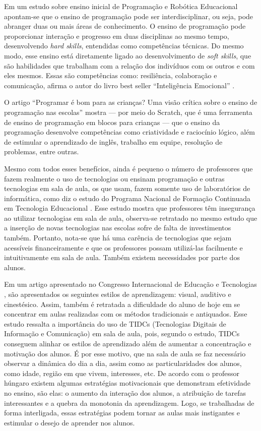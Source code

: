 Em um estudo sobre ensino inicial de Programação e Robótica Educacional \cite{antonello_cardoso_2015} apontam-se que o ensino de programação pode ser interdisciplinar, ou seja, pode abranger duas ou mais áreas de conhecimento. O ensino de programação pode proporcionar interação e progresso em duas disciplinas ao mesmo tempo, desenvolvendo \textit{hard skills}, entendidas como competências técnicas. Do mesmo modo, esse ensino está diretamente ligado ao desenvolvimento de \textit{soft skills}, que são habilidades que trabalham com a relação dos indivíduos com os outros e com eles mesmos. Essas são competências como: resiliência, colaboração e comunicação, afirma o autor do livro best seller “Inteligência Emocional” \cite{goleman_2012}.

O artigo “Programar é bom para as crianças? Uma visão crítica sobre o ensino de programação nas escolas” \cite{geraldes_2014} mostra — por meio do Scratch, que é uma ferramenta de ensino de programação em blocos para crianças — que o ensino da programação desenvolve competências como criatividade e raciocínio lógico, além de estimular o aprendizado de inglês, trabalho em equipe, resolução de problemas, entre outras.

Mesmo com todos esses benefícios, ainda é pequeno o número de professores que fazem realmente o uso de tecnologias ou ensinam programação e outras tecnologias em sala de aula, os que usam, fazem somente uso de laboratórios de informática, como diz o estudo do Programa Nacional de Formação Continuada em Tecnologia Educacional \cite{suenia_andre_2012}. Esse estudo mostra que professores têm insegurança ao utilizar tecnologias em sala de aula, observa-se retratado no mesmo estudo que a inserção de novas tecnologias nas escolas sofre de falta de investimentos também. Portanto, nota-se que há uma carência de tecnologias que sejam acessíveis financeiramente e que os professores possam utilizá-las facilmente e intuitivamente em sala de aula. Também existem necessidades por parte dos alunos.

Em um artigo apresentado no Congresso Internacional de Educação e Tecnologias \cite{lima_queiroz_santana_2018}, são apresentados os seguintes estilos de aprendizagem: visual, auditivo e cinestésico. Assim, também é retratada a dificuldade do aluno de hoje em se concentrar em aulas realizadas com os métodos tradicionais e antiquados. Esse estudo ressalta a importância do uso de TIDCs (Tecnologias Digitais de Informação e Comunicação) em sala de aula, pois, segundo o estudo, TIDCs conseguem alinhar os estilos de aprendizado além de aumentar a concentração e motivação dos alunos. É por esse motivo, que na sala de aula se faz necessário observar a dinâmica do dia a dia, assim como as particularidades dos alunos, como idade, região em que vivem, interesses, etc. De acordo com o professor húngaro \cite[p. 81]{dornyei_2001} existem algumas estratégias motivacionais que demonstram efetividade no ensino, são elas: o aumento da interação dos alunos, a atribuição de tarefas interessantes e a quebra da monotonia da aprendizagem. Logo, se trabalhadas de forma interligada, essas estratégias podem tornar as aulas mais instigantes e estimular o desejo de aprender nos alunos.

